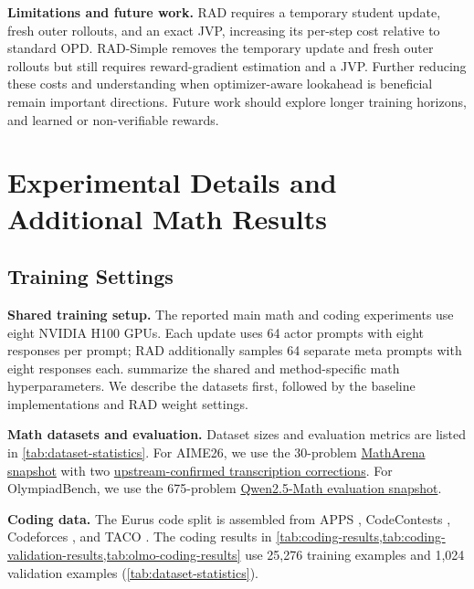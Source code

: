\documentclass{article} %
\begin{document}
\noindent\textbf{Limitations and future work.}\enspace
RAD requires a temporary student update, fresh outer rollouts, and an exact JVP, increasing its per-step cost relative to standard OPD. RAD-Simple removes the temporary update and fresh outer rollouts but still requires reward-gradient estimation and a JVP. Further reducing these costs and understanding when optimizer-aware lookahead is beneficial remain important directions.
Future work should explore longer training horizons, and learned or non-verifiable rewards.




\newpage
\appendix
\onecolumn
\appendixpage

\begingroup
\setcounter{tocdepth}{2}
\tableofcontents
\endgroup
\clearpage

\section{Experimental Details and Additional Math Results}
\label{app:experimental-details}

\subsection{Training Settings}
\label{app:training-settings}

\noindent\textbf{Shared training setup.}\enspace
The reported main math and coding experiments use eight NVIDIA H100 GPUs.
Each update uses 64 actor prompts with eight responses per prompt; RAD
additionally samples 64 separate meta prompts with eight responses each.
 summarize the shared
and method-specific math hyperparameters. We describe the datasets first,
followed by the baseline implementations and RAD weight settings.

\noindent\textbf{Math datasets and evaluation.}\enspace
Dataset sizes and evaluation metrics are listed in
\cref{tab:dataset-statistics}. For AIME26, we use the 30-problem
\href{https://huggingface.co/datasets/MathArena/aime_2026}{MathArena snapshot}
with two \href{https://github.com/eth-sri/matharena/issues/31}{upstream-confirmed transcription corrections}. For OlympiadBench,
we use the 675-problem \href{https://github.com/QwenLM/Qwen2.5-Math/blob/a45202bd16f1ec06f433442dc1152d0074773465/evaluation/data/olympiadbench/test.jsonl}{Qwen2.5-Math evaluation snapshot}.

\noindent\textbf{Coding data.}\enspace
The Eurus code split is assembled from APPS \citep{hendrycks2021apps},
CodeContests \citep{li2022competition}, Codeforces \citep{codeforces},
and TACO \citep{li2023taco}. The coding results in
\cref{tab:coding-results,tab:coding-validation-results,tab:olmo-coding-results}
use 25,276 training examples and 1,024 validation examples
(\cref{tab:dataset-statistics}).
\end{document}
